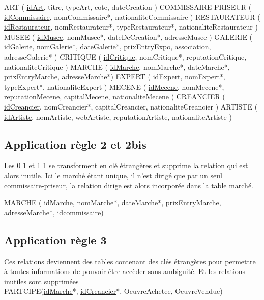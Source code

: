 \documentclass{article}
\begin{document}
ART ( \underline{idArt}, titre, typeArt, cote, dateCreation ) \newline
COMMISSAIRE-PRISEUR ( \underline{idCommissaire}, nomCommissaire*, nationaliteCommissaire )\newline
RESTAURATEUR ( \underline{idRestaurateur}, nomRestaurateur*, typeRestaurateur*, nationaliteRestaurateur )\newline
MUSEE ( \underline{idMusee}, nomMusee*, dateDeCreation*, adresseMusee )\newline
GALERIE ( \underline{idGalerie}, nomGalerie*, dateGalerie*, prixEntryExpo, association, adresseGalerie* )\newline
CRITIQUE ( \underline{idCritique}, nomCritique*, reputationCritique, nationaliteCritique )\newline
MARCHE ( \underline{idMarche}, nomMarche*, dateMarche*, prixEntryMarche, adresseMarche*)\newline
EXPERT ( \underline{idExpert}, nomExpert*, typeExpert*, nationaliteExpert )\newline
MECENE ( \underline{idMecene}, nomMecene*, reputationMecene, capitalMecene, nationaliteMecene )\newline
CREANCIER ( \underline{idCreancier}, nomCreancier*, capitalCreancier, nationaliteCreancier )\newline
ARTISTE ( \underline{idArtiste}, nomArtiste, webArtiste, reputationArtiste, nationaliteArtiste )\newline

\subsection{Application règle 2 et 2bis}

Les 0 1 et 1 1 se transforment en clé étrangères et supprime la relation qui est alors inutile.
Ici le marché étant unique, il n'est dirigé que par un seul commissaire-priseur, la relation dirige est alors incorporée dans la table marché.

MARCHE ( \underline{idMarche}, nomMarche*, dateMarche*, prixEntryMarche, adresseMarche*, \underline{\underline{idcommissaire}})

\subsection{Application règle 3}

Ces relations deviennent des tables contenant des clés étrangères pour permettre à toutes informations de pouvoir être accèder sans ambiguité.
Et les relations inutiles sont supprimées 
\\
PARTCIPE(\underline{\underline{idMarche}}*, \underline{\underline{idCreancier}}*, OeuvreAchetee, OeuvreVendue) \newline
\end{document}
